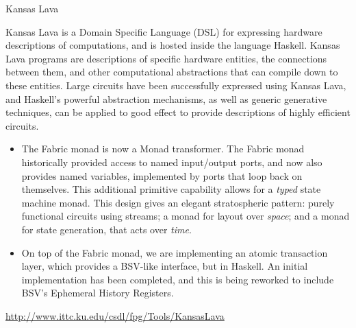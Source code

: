 \begin{hcarentry}[updated]{Kansas Lava}
\label{klava}
\makeheader

Kansas Lava is a Domain Specific Language (DSL) for expressing
hardware descriptions of computations, and is hosted inside the
language Haskell. Kansas Lava programs are descriptions of specific hardware
entities, the connections between them, and other computational abstractions
that can compile down to these entities. Large circuits have been successfully
expressed using Kansas Lava, and Haskell's powerful abstraction mechanisms, as
well as generic generative techniques, can be applied to good effect to provide
descriptions of highly efficient circuits.

\begin{itemize}

\item The Fabric monad is now a Monad transformer.
The Fabric monad historically provided access to named input/output ports,
and now also provides named variables, implemented by ports that loop back on
themselves. This additional primitive capability allows for a {\em typed\/}
state machine monad.
This design gives an elegant stratospheric pattern: purely functional circuits using streams;
a monad for layout over {\em space\/}; and a monad for state generation,
that acts over {\em time\/}.

\item 
On top of the Fabric monad, we are implementing an atomic transaction
layer, which provides a BSV-like interface, but in Haskell. An initial
implementation has been completed, and this is being reworked to include
BSV's Ephemeral History Registers.
\end{itemize}

\FurtherReading
  \url{http://www.ittc.ku.edu/csdl/fpg/Tools/KansasLava}
\end{hcarentry}
